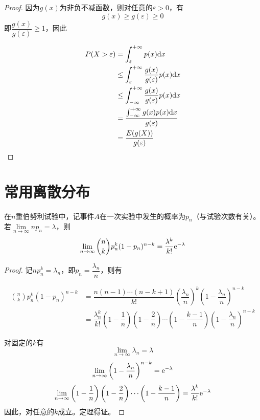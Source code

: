 \begin{proof}

    因为$g(x)$为非负不减函数，则对任意的$\varepsilon > 0$，有
    $$g(x) \geq g(\varepsilon) \geq 0$$
    即$\dfrac{g(x)}{g(\varepsilon)} \geq 1$，因此

    \begin{align*}
        P(X > \varepsilon) & = \int_{\varepsilon}^{+\infty}{p(x)}\mathrm{d} x \\
        & \leq \int_{\varepsilon}^{+\infty}{\dfrac{g(x)}{g(\varepsilon)}p(x)}\mathrm{d} x \\
        & \leq \int_{-\infty}^{+\infty}{\dfrac{g(x)}{g(\varepsilon)}p(x)}\mathrm{d} x \\
        & = \dfrac{\int_{-\infty}^{+\infty}{g(x)p(x)}\mathrm{d} x}{g(\varepsilon)} \\
        & = \dfrac{E(g(X))}{g(\varepsilon)}
    \end{align*}

\end{proof}

\section{常用离散分布}

\begin{theorem}[Poisson定理]

    在$n$重伯努利试验中，记事件$A$在一次实验中发生的概率为$p_n$（与试验次数有关）。若$\lim\limits_{n \to \infty}{n p_n} = \lambda$，则
    $$\lim\limits_{n \to \infty}{\binom{n}{k}p_n^k(1 - p_n)^{n - k}} = \dfrac{\lambda^k}{k!}\mathrm{e}^{-\lambda}$$

\end{theorem}

\begin{proof}

    记$n p_n^k = \lambda_n$，即$p_n = \dfrac{\lambda_n}{n}$，则有

    \begin{align*}
        \binom{n}{k}p_n^k(1 - p_n)^{n - k} & = \dfrac{n(n - 1) \cdots (n - k + 1)}{k!} \left( \dfrac{\lambda_n}{n} \right)^k \left( 1 - \dfrac{\lambda_n}{n} \right)^{n - k} \\
        & = \dfrac{\lambda_n^k}{k!} \left( 1 - \dfrac{1}{n} \right) \left( 1 - \dfrac{2}{n} \right) \cdots \left( 1 - \dfrac{k - 1}{n} \right) \left( 1 - \dfrac{\lambda_n}{n} \right)^{n - k}
    \end{align*}

    对固定的$k$有
    $$\lim\limits_{n \to \infty}{\lambda_n} = \lambda$$
    $$\lim\limits_{n \to \infty}{ \left( 1 - \dfrac{\lambda_n}{n} \right)^{n - k}} = \mathrm{e}^{-\lambda}$$
    $$\lim\limits_{n \to \infty}{ \left( 1 - \dfrac{1}{n} \right) \left( 1 - \dfrac{2}{n} \right) \cdots \left( 1 - \dfrac{k - 1}{n} \right)} = \dfrac{\lambda^k}{k!}\mathrm{e}^{-\lambda}$$
    因此，对任意的$k$成立。定理得证。

\end{proof}
